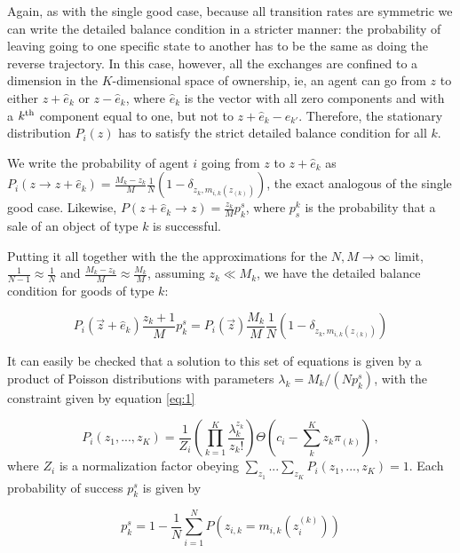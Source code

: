Again, as with the single good case, because all transition rates are symmetric we can write the detailed balance condition in a stricter manner: the probability of leaving going to one specific state to another has to be the same as doing the reverse trajectory. In this case, however, all the exchanges are confined to a dimension in the $K$-dimensional space of ownership, ie, an agent can go from $z$ to either $z + \hat e_k$ or $z - \hat e_k$, where $\hat e_k$ is the vector with all zero components and with a $k^{\rm th}$ component equal to one, but not to $z + \hat e_k - \hat e_{k'}$. Therefore, the stationary distribution $P_i (z)$ has to satisfy the strict detailed balance condition for all $k$.

We write the probability of agent $i$ going from $z$ to $z + \hat e_k$ as $P_i (z \to z + \hat e_k) = \frac{M_k - z_k}{M} \frac{1}{N} \left(1-\delta_{z_k,m_{i,k}(z_{(k)})}\right)$, the exact analogous of the single good case. Likewise, $P(z + \hat e_k \to z) = \frac{z_k}{M} p^s_k$, where $p_s^k$ is the probability that a sale of an object of type $k$ is successful.

Putting it all together with the the approximations for the $N, M \to \infty$ limit, $\frac{1}{N-1} \approx \frac{1}{N}$ and $\frac{M_k - z_k}{M} \approx \frac{M_k}{M}$, assuming $z_k \ll M_k$, we have the detailed balance condition for goods of type $k$:

\begin{equation}
\label{Eq:MasterEq3_2Goods_1Guy}
P_i(\vec z+\hat e_k)\frac{z_k+1}{M}p^s_{k}=
P_i(\vec z)  \frac{M_k}{M} \frac{1}{N} \left(1-\delta_{z_k,m_{i,k}(z_{(k)})}\right) 
\end{equation}

It can easily be checked that a solution to this set of equations is given by a product of Poisson distributions with parameters $\lambda_k=M_k/(N p^s_{k})$, with the constraint given by equation \eqref{eq:1}

\begin{equation}
P_i(z_1,..., z_{K}) = \frac{1}{Z_i} \left( \prod_{k=1}^{K}\frac{\lambda^{z_k}_k}{z_k!}\right) \Theta\left(c_i - \sum_k^{K} z_k \pi_{(k)}\right)\,,
\label{Eq:ME_solution_2Goods}
\end{equation}
where $Z_i$ is a normalization factor obeying $\sum_{z_1}...  \sum_{z_{K}}  P_i(z_1, ..., z_{K}) = 1$. Each probability of success $p_k^s$ is given by

\begin{equation}
p^s_{k} = 1 - \frac{1}{N}\sum_{i=1}^N P\left(z_{i,k}=m_{i,k}(z_i^{(k)})\right)
\label{eq:ps_Kobjs}
\end{equation}

